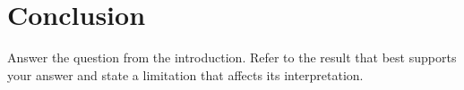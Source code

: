 \section{Conclusion}

Answer the question from the introduction. Refer to the result that best
supports your answer and state a limitation that affects its interpretation.
